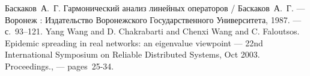 \begin{thebibliography}{9}
  Баскаков~А.~Г. Гармонический анализ линейных операторов
    / Баскаков~А.~Г.
    --- Воронеж : Издательство Воронежского Государственного Университета,
        1987.
    ---  с.~93--121.
  Yang Wang and D. Chakrabarti and Chenxi Wang and C. Faloutsos.
    Epidemic spreading in real networks: an eigenvalue viewpoint
        --- 22nd International Symposium on Reliable Distributed Systems, Oct 2003. Proceedings., --- pages~25-34.
\end{thebibliography}

